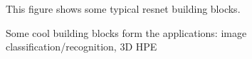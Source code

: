\begin{figure}
	This figure shows some typical resnet building blocks.
	\caption{Some cool building blocks form the applications: image classification/recognition, 3D HPE}
	\label{fig:residual-block}
\end{figure}